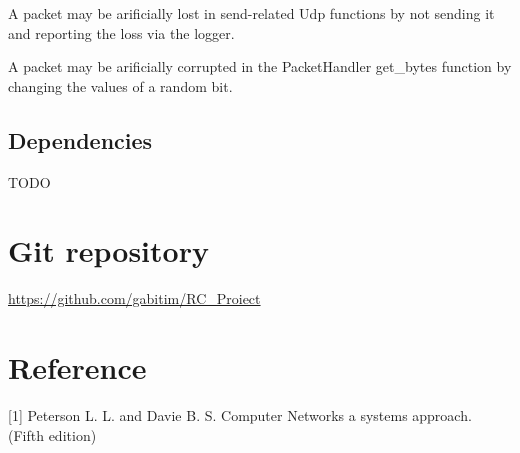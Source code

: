 \documentclass[12pt]{article}
\begin{document}
A packet may be arificially lost in send-related Udp functions by not sending it and reporting the loss via the logger.

A packet may be arificially corrupted in the PacketHandler get\_bytes function by changing the values of a random bit.

\subsection{Dependencies}

TODO

\section{Git repository}

\url{https://github.com/gabitim/RC_Proiect}

\section{Reference}

\small

[1] Peterson L. L. and Davie B. S. Computer Networks a systems approach. (Fifth edition)
\end{document}
